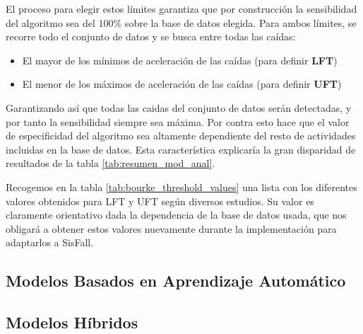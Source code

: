 El proceso para elegir estos límites garantiza que por construcción la sensibilidad del algoritmo sea del 100\% sobre la base de datos elegida. Para ambos límites, se recorre todo el conjunto de datos y se busca entre todas las caídas:
\begin{itemize}
  \item El mayor de los mínimos de aceleración de las caídas (para definir \textbf{LFT})
  \item El menor de los máximos de aceleración de las caídas (para definir \textbf{UFT})
\end{itemize}

Garantizando así que todas las caidas del conjunto de datos serán detectadas, y por tanto la sensibilidad siempre sea máxima. Por contra esto hace que el valor de especificidad del algoritmo sea altamente dependiente del resto de actividades incluidas en la base de datos. Esta característica explicaría la gran disparidad de resultados de la tabla \ref{tab:resumen_mod_anal}. 


Recogemos en la tabla \ref{tab:bourke_threshold_values} una lista con los diferentes valores obtenidos para LFT y UFT según diversos estudios. Su valor es claramente orientativo dada la dependencia de la base de datos usada, que nos obligará a obtener estos valores nuevamente durante la implementación para adaptarlos a SisFall.



\subsection{Modelos Basados en Aprendizaje Automático}

\subsection{Modelos Híbridos}

